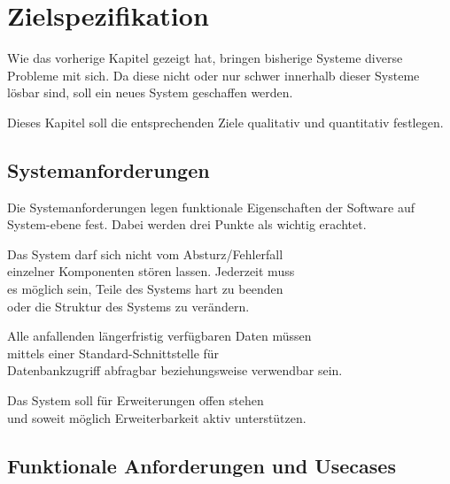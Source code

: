 \chapter{Zielspezifikation}
\label{chap:target}
Wie das vorherige Kapitel gezeigt hat,
bringen bisherige Systeme diverse Probleme mit sich.
Da diese nicht oder nur schwer innerhalb dieser Systeme lösbar sind,
soll ein neues System geschaffen werden.

Dieses Kapitel soll die entsprechenden Ziele
qualitativ und quantitativ festlegen.






\section{Systemanforderungen}

Die Systemanforderungen legen funktionale Eigenschaften der Software auf System-ebene fest.
Dabei werden drei Punkte als wichtig erachtet.


\begin{description}

\dhitem[S1]
  Das System darf sich nicht vom Absturz/Fehlerfall \\
  einzelner Komponenten stören lassen. Jederzeit muss \\
  es möglich sein, Teile des Systems hart zu beenden \\
  oder die Struktur des Systems zu verändern.

\dhitem[S2]
  Alle anfallenden längerfristig verfügbaren Daten müssen\\
  mittels einer Standard-Schnittstelle für \\
  Datenbankzugriff abfragbar beziehungsweise verwendbar sein.

\dhitem[S3]
  Das System soll für Erweiterungen offen stehen \\
  und soweit möglich Erweiterbarkeit aktiv unterstützen.
\end{description}


\section{Funktionale Anforderungen und Usecases}

